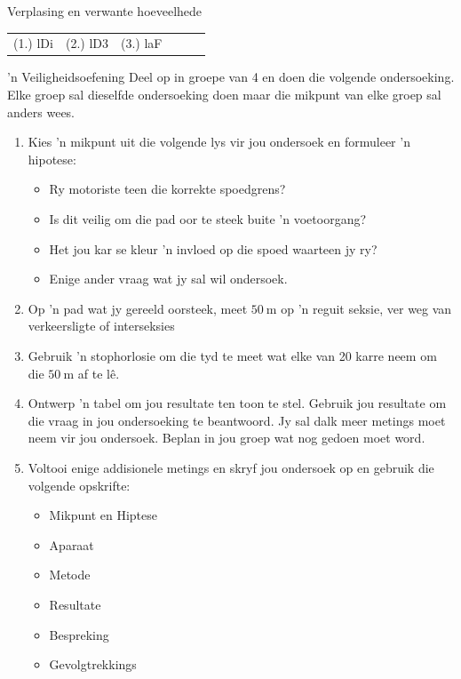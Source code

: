 \begin{exercises}{Verplasing en verwante hoeveelhede}
\practiceinfo
 \par \begin{tabular}[h]{cccccc}
 (1.) lDi  &  (2.) lD3  &  (3.) laF  & \end{tabular}
\end{exercises} \pagebreak


\begin{Investigation}{ 'n Veiligheidsoefening}
            \nopagebreak
Deel op in groepe van 4 en doen die volgende ondersoeking. Elke groep sal dieselfde ondersoeking doen maar die mikpunt van elke groep sal anders wees.\par

\begin{enumerate}[noitemsep, label=\textbf{\arabic*}. ] 
    \item Kies  'n mikpunt uit die volgende lys vir jou ondersoek en formuleer  'n hipotese:
    \begin{itemize}[noitemsep]
        \item Ry motoriste teen die korrekte spoedgrens?
        \item Is dit veilig om die pad oor te steek buite  'n voetoorgang?
        \item Het jou kar se kleur  'n invloed op die spoed waarteen jy ry?
        \item Enige ander vraag wat jy sal wil ondersoek.
\end{itemize}

\item Op  'n pad wat jy gereeld oorsteek, meet $50~\text{m}$ op  'n reguit seksie, ver weg van verkeers\-ligte of interseksies
\item Gebruik  'n stophorlosie om die tyd te meet wat elke van 20 karre neem om die $50~\text{m}$ af te l\^e.
\item Ontwerp  'n tabel om jou resultate ten toon te stel. Gebruik jou resultate om die vraag in jou ondersoeking te beantwoord. Jy sal dalk meer metings moet neem vir jou ondersoek. Beplan in jou groep wat nog gedoen moet word.
\item Voltooi enige addisionele metings en skryf jou ondersoek op en gebruik die volgende opskrifte:
\begin{itemize}[noitemsep]
    \item Mikpunt en Hiptese
    \item Aparaat
    \item Metode
    \item Resultate
    \item Bespreking
    \item Gevolgtrekkings
\end{itemize}


\end{enumerate}
\end{Investigation}
